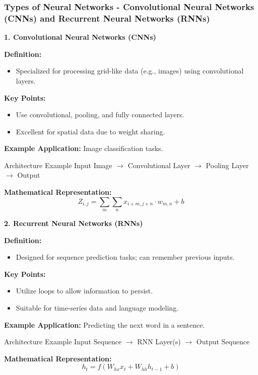 \documentclass[aspectratio=169]{beamer}
\begin{document}
\begin{frame}[fragile]
    \frametitle{Types of Neural Networks - Convolutional Neural Networks (CNNs) and Recurrent Neural Networks (RNNs)}

    \textbf{1. Convolutional Neural Networks (CNNs)}
    
    \textbf{Definition:}
    \begin{itemize}
        \item Specialized for processing grid-like data (e.g., images) using convolutional layers.
    \end{itemize}
    
    \textbf{Key Points:}
    \begin{itemize}
        \item Use convolutional, pooling, and fully connected layers.
        \item Excellent for spatial data due to weight sharing.
    \end{itemize}
    
    \textbf{Example Application:} Image classification tasks.

    \begin{block}{Architecture Example}
    Input Image $\rightarrow$ Convolutional Layer $\rightarrow$ Pooling Layer $\rightarrow$ Output
    \end{block}
    
    \textbf{Mathematical Representation:}
    \begin{equation}
        Z_{i,j} = \sum_m \sum_n x_{i+m,j+n} \cdot w_{m,n} + b
    \end{equation}

    \textbf{2. Recurrent Neural Networks (RNNs)}
    
    \textbf{Definition:}
    \begin{itemize}
        \item Designed for sequence prediction tasks; can remember previous inputs.
    \end{itemize}
    
    \textbf{Key Points:}
    \begin{itemize}
        \item Utilize loops to allow information to persist.
        \item Suitable for time-series data and language modeling.
    \end{itemize}
    
    \textbf{Example Application:} Predicting the next word in a sentence.
    
    \begin{block}{Architecture Example}
    Input Sequence $\rightarrow$ RNN Layer(s) $\rightarrow$ Output Sequence
    \end{block}
    
    \textbf{Mathematical Representation:}
    \begin{equation}
        h_t = f(W_{hx} x_t + W_{hh} h_{t-1} + b)
    \end{equation}
\end{frame}
\end{document}
